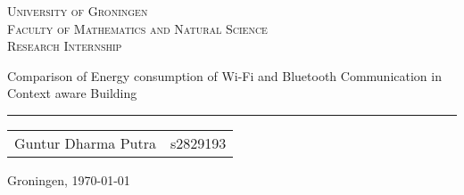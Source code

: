 
\begin{titlepage}


\newcommand{\titleinfo} {Research Internship}
\newcommand{\authorinfo} {Guntur Dharma Putra - s2829193}

\center
\textsc{\Large University of Groningen} \\[0.2cm]
\textsc{Faculty of Mathematics and Natural Science} \\[0.2cm]
\textsc{\large \titleinfo} \\[1.5cm]

\vspace{5.0cm}


\begin{flushleft}
{\LARGE Comparison of Energy consumption of Wi-Fi and Bluetooth Communication in Context aware Building}
{\rule{\linewidth}{0.1mm}}
\end{flushleft}

\begin{flushright}
	\large
	\begin{tabular}{ll}
		Guntur Dharma Putra & s2829193 
	\end{tabular}
\end{flushright}

\vfill

Groningen, \today\\

\end{titlepage}
